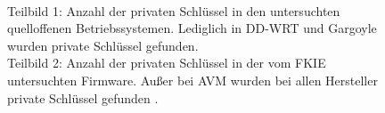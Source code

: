 \documentclass[a4paper]{book}
\begin{document}
\begin{large}
\begin{onehalfspace}
\begin{figure}[ht]
\centering
{}
\hspace*{0.05\hsize}
\caption{\\Teilbild 1: Anzahl der privaten Schlüssel in den untersuchten quelloffenen Betriebssystemen. Lediglich in DD-WRT und Gargoyle wurden private Schlüssel gefunden. \\ Teilbild 2: Anzahl der privaten Schlüssel in der vom FKIE untersuchten Firmware. Außer bei AVM wurden bei allen Hersteller private Schlüssel gefunden \cite[p.~17]{PeterWeidenbachJohannesvomDorp.2020}.}
\label{fig:Firmware Private Keys}
\end{figure}


\end{onehalfspace}



\end{large}
\end{document}
